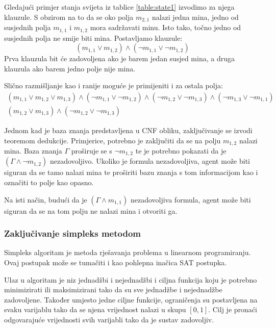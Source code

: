\documentclass{article}
\numberwithin{figure}{section}
\numberwithin{table}{section}
\begin{document}
Gledajući primjer stanja svijeta iz tablice \ref{table:state1} izvodimo za njega klauzule.
S obzirom na to da se oko polja $m_{2, 1}$ nalazi jedna mina, jedno od susjednih polja $m_{1,1}$ i $m_{1, 2}$ mora sadržavati minu. Isto tako, točno jedno od susjednih polja ne smije biti mina. Postavljamo klauzule:
\begin{equation*}
    (m_{1, 1} \vee m_{1, 2}) \wedge (\neg m_{1, 1} \vee \neg m_{1, 2})
\end{equation*}
Prva klauzula bit će zadovoljena ako
je barem jedan susjed mina, a druga klauzula ako barem jedno polje nije mina.

Slično razmišljanje kao i ranije moguće je primijeniti i za ostala polja:
\begin{gather*}
    (m_{1, 1} \vee m_{1, 2} \vee m_{1, 3}) \wedge
        (\neg m_{1, 1} \vee \neg m_{1, 2}) \wedge
        (\neg m_{1, 2} \vee \neg m_{1, 3}) \wedge
        (\neg m_{1, 3} \vee \neg m_{1, 1}) \\
    (m_{1, 2} \vee m_{1, 3}) \wedge (\neg m_{1, 2} \vee \neg m_{1, 3})
\end{gather*}

Jednom kad je baza znanja predstavljena u CNF obliku, zaključivanje se izvodi teoremom dedukcije.
Primjerice, potrebno je zaključiti da se na polju $m_{1, 2}$ nalazi mina. Baza znanja $\Gamma$
proširuje se s $\neg m_{1, 2}$ te je potrebno pokazati da je $(\Gamma \wedge \neg m_{1, 2})$
nezadovoljivo. Ukoliko je formula nezadovoljiva, agent može biti siguran da se tamo nalazi mina te proširiti
bazu znanja s tom informacijom kao i označiti to polje kao opasno.

Na isti način, budući da je $(\Gamma \wedge m_{1, 1})$ nezadovoljiva formula, agent može biti siguran da se na tom polju ne nalazi mina i otvoriti ga.


\subsubsection{Zaključivanje simpleks metodom} \label{simplex}
Simpleks algoritam je metoda rješavanja problema u linearnom programiranju. Ovaj postupak može se
tumačiti i kao pohlepna inačica SAT postupka.

Ulaz u algoritam je niz jednadžbi i nejednadžbi i ciljna funkcija koju je potrebno minimizirati ili maksimizirani tako da su sve jednadžbe i nejednadžbe zadovoljene. Također umjesto jedne ciljne funkcije, ograničenja su postavljena na svaku varijablu tako da se njena vrijednost nalazi u skupu $[0, 1]$. Cilj je pronaći odgovarajuće vrijednosti svih varijabli tako da je sustav zadovoljiv.
\end{document}
